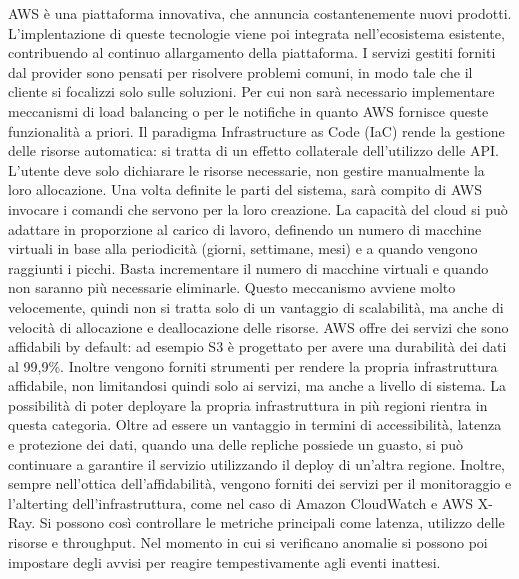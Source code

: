 AWS è una piattaforma innovativa, che annuncia costantenemente nuovi prodotti. L'implentazione di queste tecnologie viene poi integrata nell'ecosistema esistente, contribuendo al continuo allargamento della piattaforma. %
I servizi gestiti forniti dal provider sono pensati per risolvere problemi comuni, in modo tale che il cliente si focalizzi solo sulle soluzioni. Per cui non sarà necessario implementare meccanismi di load balancing o per le notifiche in quanto AWS fornisce queste funzionalità a priori. %
Il paradigma Infrastructure as Code (IaC) rende la gestione delle risorse automatica: si tratta di un effetto collaterale dell'utilizzo delle API. L'utente deve solo dichiarare le risorse necessarie, non gestire manualmente la loro allocazione. Una volta definite le parti del sistema, sarà compito di AWS invocare i comandi che servono per la loro creazione. %
La capacità del cloud si può adattare in proporzione al carico di lavoro, definendo un numero di macchine virtuali in base alla periodicità (giorni, settimane, mesi) e a quando vengono raggiunti i picchi. Basta incrementare il numero di macchine virtuali e quando non saranno più necessarie eliminarle. Questo meccanismo avviene molto velocemente, quindi non si tratta solo di un vantaggio di scalabilità, ma anche di velocità di allocazione e deallocazione delle risorse. %
AWS offre dei servizi che sono affidabili by default: ad esempio S3 è progettato per avere una durabilità dei dati al 99,9\%. Inoltre vengono forniti strumenti per rendere la propria infrastruttura affidabile, non limitandosi quindi solo ai servizi, ma anche a livello di sistema. La possibilità di poter deployare la propria infrastruttura in più regioni rientra in questa categoria. Oltre ad essere un vantaggio in termini di accessibilità, latenza e protezione dei dati, quando una delle repliche possiede un guasto, si può continuare a garantire il servizio utilizzando il deploy di un'altra regione. Inoltre, sempre nell'ottica dell'affidabilità, vengono forniti dei servizi per il monitoraggio e l'alterting dell'infrastruttura, come nel caso di Amazon CloudWatch e AWS X-Ray. Si possono così controllare le metriche principali come latenza, utilizzo delle risorse e throughput. Nel momento in cui si verificano anomalie si possono poi impostare degli avvisi per reagire tempestivamente agli eventi inattesi. 

